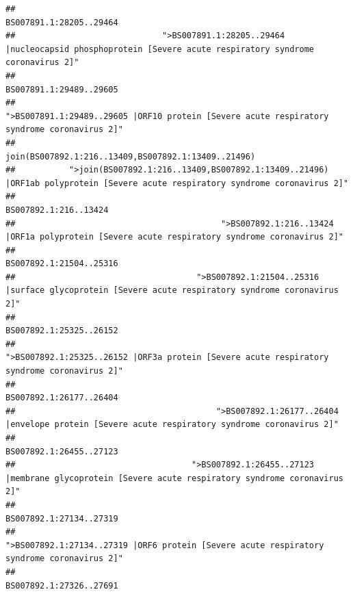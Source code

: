\documentclass[
]{article}
\begin{document}
\begin{verbatim}
##                                                                                                                BS007891.1:28205..29464 
##                              ">BS007891.1:28205..29464 |nucleocapsid phosphoprotein [Severe acute respiratory syndrome coronavirus 2]" 
##                                                                                                                BS007891.1:29489..29605 
##                                            ">BS007891.1:29489..29605 |ORF10 protein [Severe acute respiratory syndrome coronavirus 2]" 
##                                                                                    join(BS007892.1:216..13409,BS007892.1:13409..21496) 
##           ">join(BS007892.1:216..13409,BS007892.1:13409..21496) |ORF1ab polyprotein [Severe acute respiratory syndrome coronavirus 2]" 
##                                                                                                                  BS007892.1:216..13424 
##                                          ">BS007892.1:216..13424 |ORF1a polyprotein [Severe acute respiratory syndrome coronavirus 2]" 
##                                                                                                                BS007892.1:21504..25316 
##                                     ">BS007892.1:21504..25316 |surface glycoprotein [Severe acute respiratory syndrome coronavirus 2]" 
##                                                                                                                BS007892.1:25325..26152 
##                                            ">BS007892.1:25325..26152 |ORF3a protein [Severe acute respiratory syndrome coronavirus 2]" 
##                                                                                                                BS007892.1:26177..26404 
##                                         ">BS007892.1:26177..26404 |envelope protein [Severe acute respiratory syndrome coronavirus 2]" 
##                                                                                                                BS007892.1:26455..27123 
##                                    ">BS007892.1:26455..27123 |membrane glycoprotein [Severe acute respiratory syndrome coronavirus 2]" 
##                                                                                                                BS007892.1:27134..27319 
##                                             ">BS007892.1:27134..27319 |ORF6 protein [Severe acute respiratory syndrome coronavirus 2]" 
##                                                                                                                BS007892.1:27326..27691 

\end{verbatim}
\end{document}
